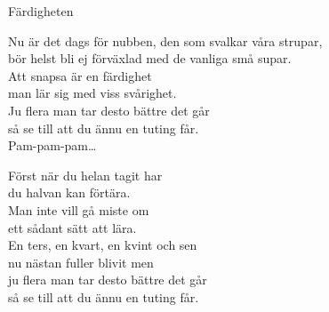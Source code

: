 \begin{song}{Färdigheten}

    
    

    Nu är det dags för nubben, den som svalkar våra strupar,\\
	bör helst bli ej förväxlad med de vanliga små supar.\\
	Att snapsa är en färdighet\\
	man lär sig med viss svårighet.\\
	Ju flera man tar desto bättre det går \\
	så se till att du ännu en tuting får.\\
	Pam-pam-pam\dots

	Först när du helan tagit har\\
	du halvan kan förtära.\\
	Man inte vill gå miste om\\
	ett sådant sätt att lära.\\
	En ters, en kvart, en kvint och sen\\
	nu nästan fuller blivit men\\
	ju flera man tar desto bättre det går \\
	så se till att du ännu en tuting får.


\end{song}
